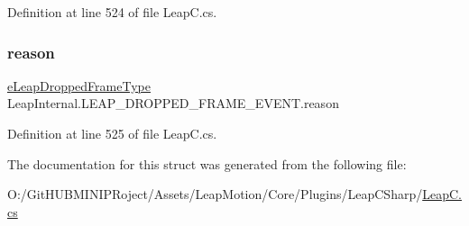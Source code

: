 Definition at line 524 of file Leap\+C.\+cs.

\mbox{\label{struct_leap_internal_1_1_l_e_a_p___d_r_o_p_p_e_d___f_r_a_m_e___e_v_e_n_t_ad2167f447f84732befdb08cc5f0d8b78}} 
\subsubsection{\texorpdfstring{reason}{reason}}
{\footnotesize\ttfamily \mbox{\hyperlink{namespace_leap_internal_af32f98bc0f7257d572aa3f3c3dac43a3}{e\+Leap\+Dropped\+Frame\+Type}} Leap\+Internal.\+L\+E\+A\+P\+\_\+\+D\+R\+O\+P\+P\+E\+D\+\_\+\+F\+R\+A\+M\+E\+\_\+\+E\+V\+E\+N\+T.\+reason}



Definition at line 525 of file Leap\+C.\+cs.



The documentation for this struct was generated from the following file\+:\begin{DoxyCompactItemize}
\item 
O\+:/\+Git\+H\+U\+B\+M\+I\+N\+I\+P\+Roject/\+Assets/\+Leap\+Motion/\+Core/\+Plugins/\+Leap\+C\+Sharp/\mbox{\hyperlink{_leap_c_8cs}{Leap\+C.\+cs}}\end{DoxyCompactItemize}
